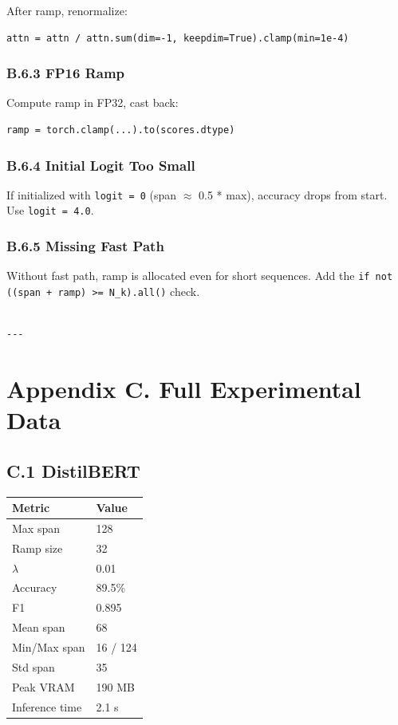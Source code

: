 After ramp, renormalize:
\begin{lstlisting}
attn = attn / attn.sum(dim=-1, keepdim=True).clamp(min=1e-4)
\end{lstlisting}

\subsubsection{B.6.3 FP16 Ramp}

Compute ramp in FP32, cast back:
\begin{lstlisting}
ramp = torch.clamp(...).to(scores.dtype)
\end{lstlisting}

\subsubsection{B.6.4 Initial Logit Too Small}

If initialized with \texttt{logit = 0} (span $\approx$ 0.5 * max), accuracy drops from start. 
Use \texttt{logit = 4.0}.

\subsubsection{B.6.5 Missing Fast Path}

Without fast path, ramp is allocated even for short sequences. Add the 
\texttt{if not ((span + ramp) >= N\_k).all()} check.
\begin{lstlisting}

---
\end{lstlisting}


\section{Appendix C. Full Experimental Data}

\subsection{C.1 DistilBERT}

\begin{table}[H]
\centering
\small
\begin{tabular}{ll}
\toprule
\textbf{Metric} & \textbf{Value} \\
\midrule
Max span & 128 \\
Ramp size & 32 \\
$\lambda$ & 0.01 \\
Accuracy & 89.5\% \\
F1 & 0.895 \\
Mean span & 68 \\
Min/Max span & 16 / 124 \\
Std span & 35 \\
Peak VRAM & 190 MB \\
Inference time & 2.1 s \\
\bottomrule
\end{tabular}
\end{table}

